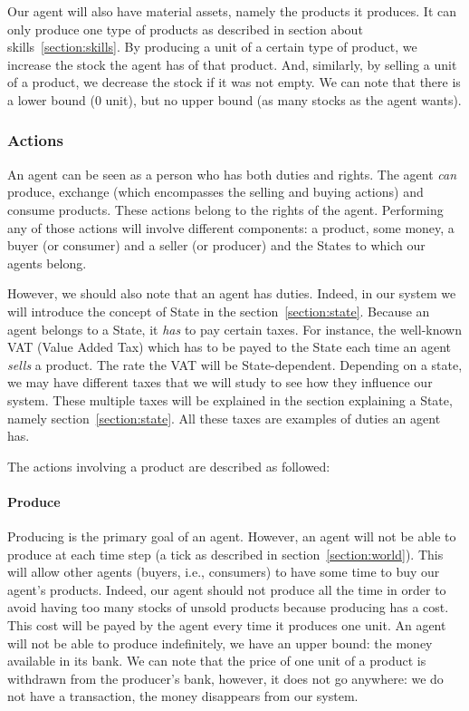 Our agent will also have material assets, namely the products it produces. It can only produce one type of products as described in section about skills~\ref{section:skills}. By producing a unit of a certain type of product, we increase the stock the agent has of that product. And, similarly, by selling a unit of a product, we decrease the stock if it was not empty. We can note that there is a lower bound (0 unit), but no upper bound (as many stocks as the agent wants).


\subsubsection{Actions}\label{section:actions}
An agent can be seen as a person who has both duties and rights. The agent \emph{can} produce, exchange (which encompasses the selling and buying actions) and consume products. These actions belong to the rights of the agent. Performing any of those actions will involve different components: a product, some money, a buyer (or consumer) and a seller (or producer) and the States to which our agents belong. 

However, we should also note that an agent has duties. Indeed, in our system we will introduce the concept of State in the section~\ref{section:state}. Because an agent belongs to a State, it \emph{has} to pay certain taxes. 
For instance, the well-known VAT (Value Added Tax) which has to be payed to the State each time an agent \emph{sells} a product. The rate the VAT will be State-dependent. Depending on a state, we may have different taxes that we will study to see how they influence our system. These multiple taxes will be explained in the section explaining a State, namely section~\ref{section:state}. All these taxes are examples of duties an agent has.

The actions involving a product are described as followed:

\paragraph{Produce}
Producing is the primary goal of an agent. However, an agent will not be able to produce at each time step (a tick as described in section~\ref{section:world}).
This will allow other agents (buyers, i.e., consumers) to have some time to buy our agent's products. Indeed, our agent should not produce all the time in order to avoid having too many stocks of unsold products because producing has a cost. This cost will be payed by the agent every time it produces one unit. 
An agent will not be able to produce indefinitely, we have an upper bound: the money available in its bank. We can note that the price of one unit of a product is withdrawn from the producer's bank, however, it does not go anywhere: we do not have a transaction, the money disappears from our system.

